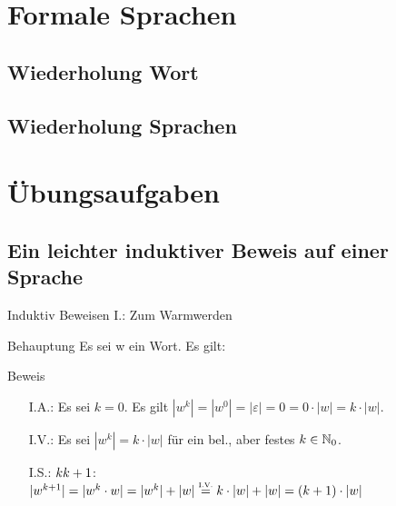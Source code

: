 \section{Formale Sprachen}
\subsection{Wiederholung Wort} %
\subsection{Wiederholung Sprachen} %

\section{Übungsaufgaben}
\subsection{Ein leichter induktiver Beweis auf einer Sprache}
\begin{frame}{Induktiv Beweisen I.: Zum Warmwerden}
	\begin{exampleblock}{Behauptung}
		Es sei w ein Wort. Es gilt:\\
	\end{exampleblock}
\pause
	\begin{block}{Beweis}
		\begin{itemize}
			\item[I.A.:] Es sei $k=0$. Es gilt $|w^k|=|w^0|=|\varepsilon|=0=0 \cdot |w| = k \cdot |w|$.
			\item[I.V.:] Es sei $|w^k|=k \cdot |w|$ für ein bel., aber festes $k\in \mathbb{N}_0$.
			\item[I.S.:] $k \Stephan{\curvearrowright} \notStephan{\leadsto} k+1$:\\
						 $|w^{k+1}|=|w^k \cdot w|=|w^k|+|w| \eqtext{I.V.} k \cdot |w| + |w| = (k+1) \cdot |w|$
		\end{itemize}
	\end{block}
\end{frame}
